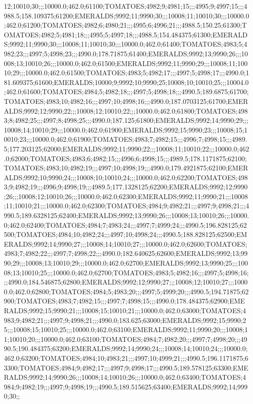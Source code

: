 12;10010;30;;;10000.0;462.0;61100;TOMATOES;4982;9;4981;15;;;4995;9;4997;15;;;4988.5;158.109375;61200;EMERALDS;9992;11;9990;30;;;10008;11;10010;30;;;10000.0;462.0;61200;TOMATOES;4982;6;4980;21;;;4995;6;4996;21;;;4988.5;150.25;61300;TOMATOES;4982;5;4981;18;;;4995;5;4997;18;;;4988.5;154.484375;61300;EMERALDS;9992;11;9990;30;;;10008;11;10010;30;;;10000.0;462.0;61400;TOMATOES;4983;5;4982;23;;;4997;5;4998;23;;;4990.0;178.71875;61400;EMERALDS;9992;13;9990;26;;;10008;13;10010;26;;;10000.0;462.0;61500;EMERALDS;9992;11;9990;29;;;10008;11;10010;29;;;10000.0;462.0;61500;TOMATOES;4983;5;4982;17;;;4997;5;4998;17;;;4990.0;181.609375;61600;EMERALDS;10000;9;9992;10;9990;25;10008;10;10010;25;;;10004.0;462.0;61600;TOMATOES;4984;5;4982;18;;;4997;5;4998;18;;;4990.5;189.6875;61700;TOMATOES;4983;10;4982;16;;;4997;10;4998;16;;;4990.0;187.0703125;61700;EMERALDS;9992;12;9990;22;;;10008;12;10010;22;;;10000.0;462.0;61800;TOMATOES;4983;8;4982;25;;;4997;8;4998;25;;;4990.0;187.125;61800;EMERALDS;9992;14;9990;29;;;10008;14;10010;29;;;10000.0;462.0;61900;EMERALDS;9992;15;9990;23;;;10008;15;10010;23;;;10000.0;462.0;61900;TOMATOES;4983;7;4982;15;;;4996;7;4998;15;;;4989.5;177.203125;62000;EMERALDS;9992;11;9990;22;;;10008;11;10010;22;;;10000.0;462.0;62000;TOMATOES;4983;6;4982;15;;;4996;6;4998;15;;;4989.5;178.1171875;62100;TOMATOES;4983;10;4982;19;;;4997;10;4998;19;;;4990.0;179.4921875;62100;EMERALDS;9992;10;9990;24;;;10008;10;10010;24;;;10000.0;462.0;62200;TOMATOES;4983;9;4982;19;;;4996;9;4998;19;;;4989.5;177.1328125;62200;EMERALDS;9992;12;9990;26;;;10008;12;10010;26;;;10000.0;462.0;62300;EMERALDS;9992;11;9990;21;;;10008;11;10010;21;;;10000.0;462.0;62300;TOMATOES;4984;9;4982;21;;;4997;9;4998;21;;;4990.5;189.6328125;62400;EMERALDS;9992;13;9990;26;;;10008;13;10010;26;;;10000.0;462.0;62400;TOMATOES;4984;7;4983;24;;;4997;7;4999;24;;;4990.5;196.828125;62500;TOMATOES;4984;10;4982;24;;;4997;10;4998;24;;;4990.5;188.828125;62500;EMERALDS;9992;14;9990;27;;;10008;14;10010;27;;;10000.0;462.0;62600;TOMATOES;4983;7;4982;22;;;4997;7;4998;22;;;4990.0;182.640625;62600;EMERALDS;9992;13;9990;29;;;10008;13;10010;29;;;10000.0;462.0;62700;EMERALDS;9992;13;9990;25;;;10008;13;10010;25;;;10000.0;462.0;62700;TOMATOES;4983;5;4982;16;;;4997;5;4998;16;;;4990.0;184.546875;62800;EMERALDS;9992;12;9990;27;;;10008;12;10010;27;;;10000.0;462.0;62800;TOMATOES;4984;5;4983;20;;;4997;5;4999;20;;;4990.5;194.71875;62900;TOMATOES;4983;7;4982;15;;;4997;7;4998;15;;;4990.0;178.484375;62900;EMERALDS;9992;15;9990;21;;;10008;15;10010;21;;;10000.0;462.0;63000;TOMATOES;4983;9;4982;21;;;4997;9;4998;21;;;4990.0;183.625;63000;EMERALDS;9992;15;9990;25;;;10008;15;10010;25;;;10000.0;462.0;63100;EMERALDS;9992;11;9990;20;;;10008;11;10010;20;;;10000.0;462.0;63100;TOMATOES;4984;7;4982;20;;;4997;7;4998;20;;;4990.5;190.484375;63200;EMERALDS;9992;14;9990;24;;;10008;14;10010;24;;;10000.0;462.0;63200;TOMATOES;4984;10;4983;21;;;4997;10;4999;21;;;4990.5;196.1171875;63300;TOMATOES;4984;9;4982;17;;;4997;9;4998;17;;;4990.5;189.578125;63300;EMERALDS;9992;14;9990;26;;;10008;14;10010;26;;;10000.0;462.0;63400;TOMATOES;4984;9;4982;19;;;4997;9;4998;19;;;4990.5;189.515625;63400;EMERALDS;9992;14;9990;30;;